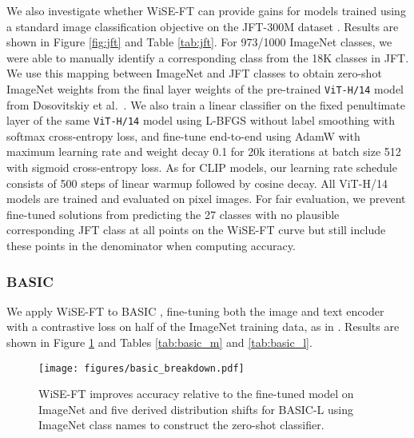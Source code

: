 We also investigate whether WiSE-FT can provide gains for models trained using a standard image classification objective on the JFT-300M dataset \cite{sun2017revisiting}. Results are shown in Figure \ref{fig:jft} and Table \ref{tab:jft}. For 973/1000 ImageNet classes, we were able to manually identify a corresponding class from the 18K classes in JFT. We use this mapping between ImageNet and JFT classes to obtain zero-shot ImageNet weights from the final layer weights of the pre-trained \texttt{ViT-H/14} model from Dosovitskiy et al.~\cite{dosovitskiy2021an}. We also train a linear classifier on the fixed penultimate layer of the same \texttt{ViT-H/14} model using L-BFGS without label smoothing with softmax cross-entropy loss, and fine-tune end-to-end using AdamW with maximum learning rate  and weight decay 0.1 for 20k iterations at batch size 512 with sigmoid cross-entropy loss. As for CLIP models, our learning rate schedule consists of 500 steps of linear warmup followed by cosine decay. All ViT-H/14 models are trained and evaluated on  pixel images. For fair evaluation, we prevent fine-tuned solutions from predicting the 27 classes with no plausible corresponding JFT class at all points on the WiSE-FT curve but still include these points in the denominator when computing accuracy. 

\FloatBarrier

\subsubsection{BASIC}
\label{sec:basic}

We apply WiSE-FT to BASIC \cite{pham2021scaling}, fine-tuning both the image and text encoder with a contrastive loss on half of the ImageNet training data, as in \citet{pham2021scaling}. Results are shown in Figure \ref{fig:basicbreakdown} and Tables \ref{tab:basic_m} and \ref{tab:basic_l}.


\begin{figure}[h]
    \centering
    \texttt{[image: figures/basic\_breakdown.pdf]}
    \caption{WiSE-FT improves accuracy relative to the fine-tuned model on ImageNet and five derived distribution shifts for BASIC-L \cite{pham2021scaling} using ImageNet class names to construct the zero-shot classifier.}
    \label{fig:basicbreakdown}
\end{figure}


